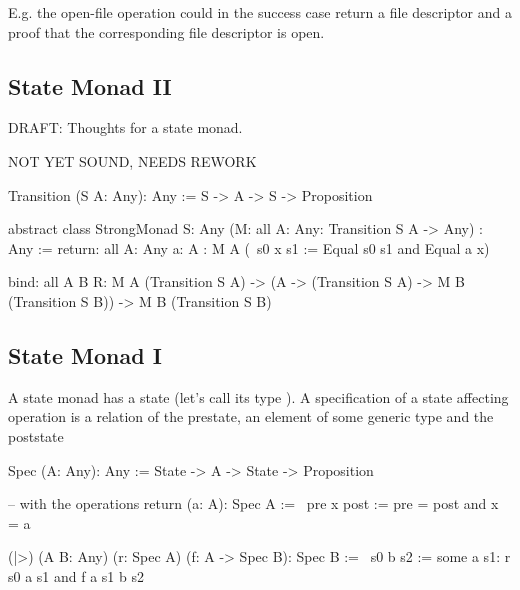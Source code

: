 E.g. the open-file operation could in the success case return a file
descriptor and a proof that the corresponding file descriptor is open.







\subsection{State Monad II}


\noindent DRAFT: Thoughts for a state monad.

NOT YET SOUND, NEEDS REWORK


\begin{alba}
    Transition (S A: Any): Any :=
        S -> A -> S -> Proposition


    abstract class
        StrongMonad
            {S: Any}
            (M: all {A: Any}: Transition S A -> Any)
            : Any
    :=
        return:
            all
                {A: Any}
                {a: A}
                : M A (\ s0 x s1 := Equal s0 s1 and Equal a x)

        bind:
            all {A B R}:
                M A (Transition S A)
                -> (A -> (Transition S A) -> M B (Transition S B))
                -> M B (Transition S B)
\end{alba}







\subsection {State Monad I}

A state monad has a state (let's call its type ). A specification of
a state affecting operation is a relation of the prestate, an element of some
generic type and the poststate
%
\begin{alba}
    Spec (A: Any): Any :=
        State -> A -> State -> Proposition

    -- with the operations
    return (a: A): Spec A :=
        \ pre x post :=
            pre = post and x = a

    (|>) (A B: Any) (r: Spec A) (f: A -> Spec B): Spec B :=
        \ s0 b s2 :=
            some a s1:
                r s0 a s1
                and f a s1 b s2
\end{alba}

